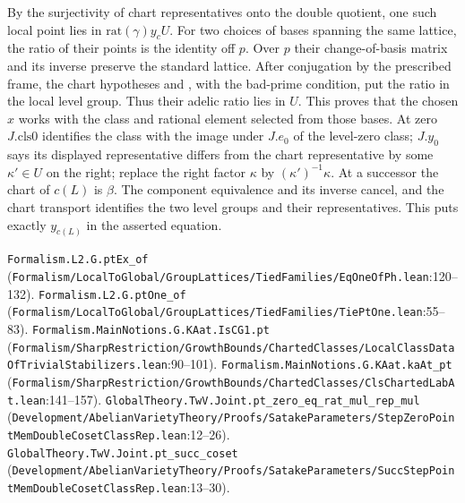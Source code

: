 By the surjectivity of chart representatives onto the double quotient, one such local point lies in $\mathrm{rat}(\gamma)y_c U$. For two choices of bases spanning the same lattice, the ratio of their points is the identity off $p$. Over $p$ their change-of-basis matrix and its inverse preserve the standard lattice. After conjugation by the prescribed frame, the chart hypotheses  and , with the bad-prime condition, put the ratio in the local level group. Thus their adelic ratio lies in $U$. This proves that the chosen $x$ works with the class and rational element selected from those bases. At zero $J.\mathrm{cls0}$ identifies the class with the image under $J.e_0$ of the level-zero class; $J.y_0$ says its displayed representative differs from the chart representative by some $\kappa'\in U$ on the right; replace the right factor $\kappa$ by $(\kappa')^{-1}\kappa$. At a successor the chart of $c(L)$ is $\beta$. The component equivalence and its inverse cancel, and the chart transport identifies the two level groups and their representatives. This puts exactly $y_{c(L)}$ in the asserted equation.
\par{\footnotesize \nolinkurl{Formalism.L2.G.ptEx_of} (\nolinkurl{Formalism/LocalToGlobal/GroupLattices/TiedFamilies/EqOneOfPh.lean}\allowbreak:120--132). \nolinkurl{Formalism.L2.G.ptOne_of} (\nolinkurl{Formalism/LocalToGlobal/GroupLattices/TiedFamilies/TiePtOne.lean}\allowbreak:55--83). \nolinkurl{Formalism.MainNotions.G.KAat.IsCG1.pt} (\nolinkurl{Formalism/SharpRestriction/GrowthBounds/ChartedClasses/LocalClassDataOfTrivialStabilizers.lean}\allowbreak:90--101). \nolinkurl{Formalism.MainNotions.G.KAat.kaAt_pt} (\nolinkurl{Formalism/SharpRestriction/GrowthBounds/ChartedClasses/ClsChartedLabAt.lean}\allowbreak:141--157). \nolinkurl{GlobalTheory.TwV.Joint.pt_zero_eq_rat_mul_rep_mul} (\nolinkurl{Development/AbelianVarietyTheory/Proofs/SatakeParameters/StepZeroPointMemDoubleCosetClassRep.lean}\allowbreak:12--26). \nolinkurl{GlobalTheory.TwV.Joint.pt_succ_coset} (\nolinkurl{Development/AbelianVarietyTheory/Proofs/SatakeParameters/SuccStepPointMemDoubleCosetClassRep.lean}\allowbreak:13--30).\par}

